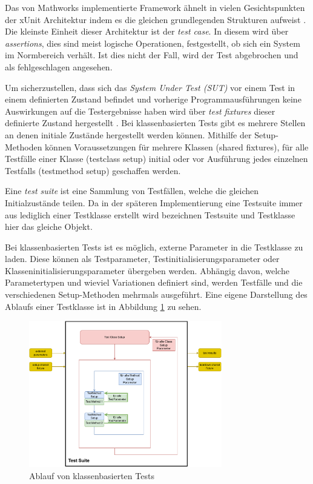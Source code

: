 Das von Mathworks implementierte Framework ähnelt in vielen Gesichtspunkten der xUnit Architektur indem es die gleichen grundlegenden Strukturen aufweist \cite{xUnitWiki}. Die kleinste Einheit dieser Architektur ist der \textit{test case}. In diesem wird über \textit{assertions}, dies sind meist logische Operationen, festgestellt, ob sich ein System im Normbereich verhält. Ist dies nicht der Fall, wird der Test abgebrochen und als fehlgeschlagen angesehen.

Um sicherzustellen, dass sich das \textit{System Under Test (SUT)} vor einem Test in einem definierten Zustand befindet und vorherige Programmausführungen keine Auswirkungen auf die Testergebnisse haben wird über \textit{test fixtures} dieser definierte Zustand hergestellt \cite{xUnitpatterns}. Bei klassenbasierten Tests gibt es mehrere Stellen an denen initiale Zustände hergestellt werden können. Mithilfe der Setup-Methoden können Voraussetzungen für mehrere Klassen (shared fixtures), für alle Testfälle einer Klasse (testclass setup) initial oder vor Ausführung jedes einzelnen Testfalls (testmethod setup) geschaffen werden.

Eine \textit{test suite} ist eine Sammlung von Testfällen, welche die gleichen Initialzustände teilen. Da in der späteren Implementierung eine Testsuite immer aus lediglich einer Testklasse erstellt wird bezeichnen Testsuite und Testklasse hier das gleiche Objekt. 

Bei klassenbasierten Tests ist es möglich, externe Parameter in die Testklasse zu laden. Diese können als Testparameter, Testinitialisierungsparameter oder Klasseninitialisierungsparameter übergeben werden. Abhängig davon, welche Parametertypen und wieviel Variationen definiert sind, werden Testfälle und die verschiedenen Setup-Methoden mehrmals ausgeführt. Eine eigene Darstellung des Ablaufs einer Testklasse ist in Abbildung \ref{fig:Testklassen_Ablauf} zu sehen. 

\begin{figure}
    \centering
    \includegraphics[width=0.75\textwidth]{figures/3_Implementierung/Testklassen_Ablauf.drawio.pdf}
    \caption{Ablauf von klassenbasierten Tests}
    \label{fig:Testklassen_Ablauf}
\end{figure}

